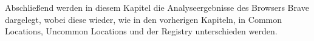 Abschließend werden in diesem Kapitel die Analyseergebnisse des Browsers Brave dargelegt, wobei diese wieder, wie in den vorherigen Kapiteln, in Common Locations, Uncommon Locations und der Registry unterschieden werden.

